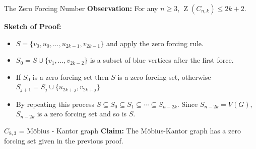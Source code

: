 \documentclass[final]{beamer}
\def\red{\color{red}}
\newcommand{\Z}{\operatorname{Z}}
\begin{document}
\begin{frame}{}
\begin{columns}[t]
    

\begin{column}{0.38 \linewidth}

   
        
\begin{block}{\red The Zero Forcing Number}
        {\bf Observation:} For any $ n \geq 3 $, $ \Z(C_{n,k}) \leq 2k + 2 $.
        
\textbf{Sketch of Proof:}
\begin{itemize}
\item $S = \{v_0, u_0, \dots, u_{2k-1}, v_{2k-1}\}$ and apply the zero forcing rule.\\
\item $S_0 = S \cup \{v_1, \dots, v_{2k-2}\}$ is a subset of blue vertices
after the first force.\\
\item If $S_0 $ is a zero forcing set then $S$ is a zero forcing set, otherwise $S_{j+1} = S_j \cup \{u_{2k+j},v_{2k+j}\}$\\
\item By repeating this process $S\subseteq S_0 \subseteq S_1 \subseteq \cdots
\subseteq S_{n-2k}$. Since $S_{n-2k} = V(G)$, $S_{n-2k}$ is a zero forcing set and so is $S$.
\end{itemize}

\end{block}

\begin{block}{$C_{8,3}$ = M\"{o}bius - Kantor graph}
\textbf{Claim:} The M\"{o}bius-Kantor graph has a zero forcing set given in the
previous proof.
\begin{figure}[h!]
\centering
{}
\end{figure}


\end{block}
\end{column}
\end{columns}
\end{frame}
\end{document}
